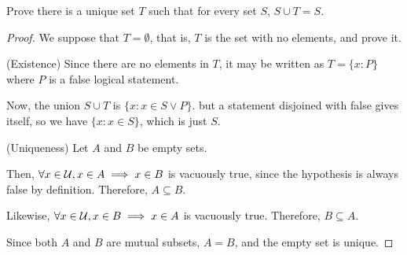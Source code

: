 \begin{recommended}
  Prove there is a unique set $T$ such that for every set $S$, $S \cup T = S$.
\end{recommended}
\begin{proof}
  We suppose that $T=\emptyset$, that is, $T$ is the set with no elements, and prove it.

  (Existence) Since there are no elements in $T$, it may be written as $T=\{ x : P \}$
  where $P$ is a false logical statement.

  Now, the union $S \cup T$ is $\{ x : x \in S \lor P \}$.
  but a statement disjoined with false gives itself, so we have $\{ x : x \in S \}$, which is just $S$.

  (Uniqueness) Let $A$ and $B$ be empty sets.

  Then, $\forall x \in \mathcal{U}, x \in A \implies x \in B$ is vacuously true, since the hypothesis is always false by definition.
  Therefore, $A \subseteq B$.

  Likewise, $\forall x \in \mathcal{U}, x \in B \implies x \in A$ is vacuously true.
  Therefore, $B \subseteq A$.

  Since both $A$ and $B$ are mutual subsets, $A=B$, and the empty set is unique.
\end{proof}


